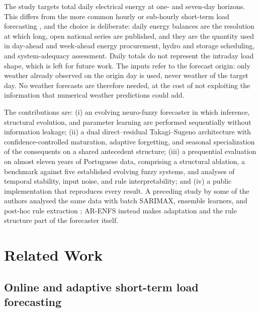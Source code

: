 \documentclass[preprint,12pt]{elsarticle}
\begin{document}
The study targets total daily electrical energy at one- and seven-day horizons. This differs from the more common hourly or sub-hourly short-term load forecasting \citep{gross1987stlf,hong2016probabilistic}, and the choice is deliberate: daily energy balances are the resolution at which long, open national series are published, and they are the quantity used in day-ahead and week-ahead energy procurement, hydro and storage scheduling, and system-adequacy assessment. Daily totals do not represent the intraday load shape, which is left for future work. The inputs refer to the forecast origin: only weather already observed on the origin day is used, never weather of the target day. No weather forecasts are therefore needed, at the cost of not exploiting the information that numerical weather predictions could add.

The contributions are: (i) an evolving neuro-fuzzy forecaster in which inference, structural evolution, and parameter learning are performed sequentially without information leakage; (ii) a dual direct--residual Takagi--Sugeno architecture with confidence-controlled maturation, adaptive forgetting, and seasonal specialization of the consequents on a shared antecedent structure; (iii) a prequential evaluation on almost eleven years of Portuguese data, comprising a structural ablation, a benchmark against five established evolving fuzzy systems, and analyses of temporal stability, input noise, and rule interpretability; and (iv) a public implementation that reproduces every result. A preceding study by some of the authors analysed the same data with batch SARIMAX, ensemble learners, and post-hoc rule extraction \citep{catarro2026hybrid}; AR-ENFS instead makes adaptation and the rule structure part of the forecaster itself.

\section{Related Work}
\label{sec:related_work}

\subsection{Online and adaptive short-term load forecasting}
\label{sec:related_stlf}
\end{document}
